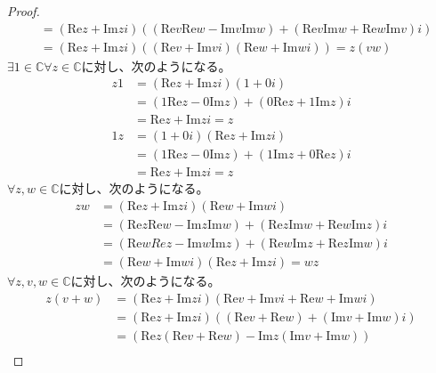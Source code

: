 \documentclass[dvipdfmx]{jsarticle}
\begin{document}
\begin{proof}
\begin{align*}
&= \left( \mathrm{Re}z + \mathrm{Im}zi \right)\left( \left( \mathrm{Re}v\mathrm{Re}w - \mathrm{Im}v\mathrm{Im}w \right) + \left( \mathrm{Re}v\mathrm{Im}w + \mathrm{Re}w\mathrm{Im}v \right)i \right)\\
&= \left( \mathrm{Re}z + \mathrm{Im}zi \right)\left( \left( \mathrm{Re}v + \mathrm{Im}vi \right)\left( \mathrm{Re}w + \mathrm{Im}wi \right) \right) = z(vw)
\end{align*}
$\exists 1 \in \mathbb{C}\forall z \in \mathbb{C}$に対し、次のようになる。
\begin{align*}
z1 &= \left( \mathrm{Re}z + \mathrm{Im}zi \right)(1 + 0i)\\
&= \left( 1\mathrm{Re}z - 0\mathrm{Im}z \right) + \left( 0\mathrm{Re}z + 1\mathrm{Im}z \right)i\\
&= \mathrm{Re}z + \mathrm{Im}zi = z\\
1z &= (1 + 0i)\left( \mathrm{Re}z + \mathrm{Im}zi \right)\\
&= \left( 1\mathrm{Re}z - 0\mathrm{Im}z \right) + \left( 1\mathrm{Im}z + 0\mathrm{Re}z \right)i\\
&= \mathrm{Re}z + \mathrm{Im}zi = z
\end{align*}
$\forall z,w \in \mathbb{C}$に対し、次のようになる。
\begin{align*}
zw &= \left( \mathrm{Re}z + \mathrm{Im}zi \right)\left( \mathrm{Re}w + \mathrm{Im}wi \right)\\
&= \left( \mathrm{Re}z\mathrm{Re}w - \mathrm{Im}z\mathrm{Im}w \right) + \left( \mathrm{Re}z\mathrm{Im}w + \mathrm{Re}w\mathrm{Im}z \right)i\\
&= \left( \mathrm{Re}wRez - \mathrm{Im}w\mathrm{Im}z \right) + \left( \mathrm{Re}w\mathrm{Im}z + \mathrm{Re}z\mathrm{Im}w \right)i\\
&= \left( \mathrm{Re}w + \mathrm{Im}wi \right)\left( \mathrm{Re}z + \mathrm{Im}zi \right) = wz
\end{align*}
$\forall z,v,w \in \mathbb{C}$に対し、次のようになる。
\begin{align*}
z(v + w) &= \left( \mathrm{Re}z + \mathrm{Im}zi \right)\left( \mathrm{Re}v + \mathrm{Im}vi + \mathrm{Re}w + \mathrm{Im}wi \right)\\
&= \left( \mathrm{Re}z + \mathrm{Im}zi \right)\left( \left( \mathrm{Re}v + \mathrm{Re}w \right) + \left( \mathrm{Im}v + \mathrm{Im}w \right)i \right)\\
&= \left( \mathrm{Re}z\left( \mathrm{Re}v + \mathrm{Re}w \right) - \mathrm{Im}z\left( \mathrm{Im}v + \mathrm{Im}w \right) \right) \\

\end{align*}
\end{proof}
\end{document}
